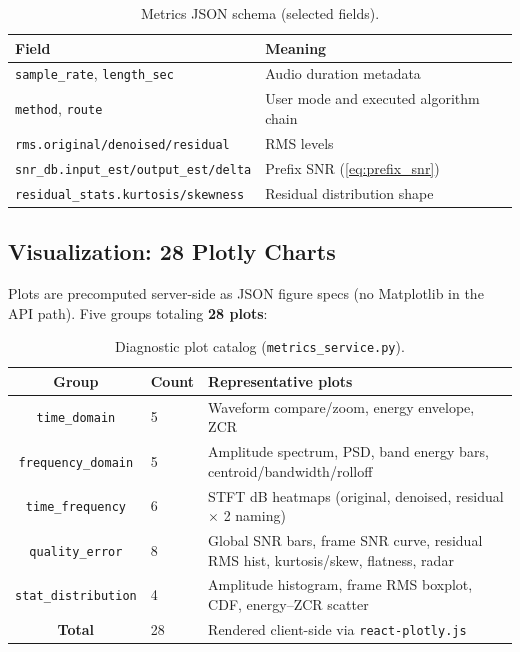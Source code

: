 \begin{table}[H]
  \centering
  \caption{Metrics JSON schema (selected fields).}
  \label{tab:metrics_schema}
  \small
  \begin{tabular}{ll}
    \toprule
    \textbf{Field} & \textbf{Meaning} \\
    \midrule
    \texttt{sample\_rate}, \texttt{length\_sec} & Audio duration metadata \\
    \texttt{method}, \texttt{route} & User mode and executed algorithm chain \\
    \texttt{rms.original/denoised/residual} & RMS levels \\
    \texttt{snr\_db.input\_est/output\_est/delta} & Prefix SNR (\eqref{eq:prefix_snr}) \\
    \texttt{residual\_stats.kurtosis/skewness} & Residual distribution shape \\
    \bottomrule
  \end{tabular}
\end{table}

\subsection{Visualization: 28 Plotly Charts}

Plots are precomputed server-side as JSON figure specs (no Matplotlib in the API path). Five groups totaling \textbf{28 plots}:

\begin{table}[H]
  \centering
  \caption{Diagnostic plot catalog (\texttt{metrics\_service.py}).}
  \label{tab:plot_catalog}
  \footnotesize
  \begin{tabular}{clp{6.2cm}}
    \toprule
    \textbf{Group} & \textbf{Count} & \textbf{Representative plots} \\
    \midrule
    \texttt{time\_domain}       & 5 & Waveform compare/zoom, energy envelope, ZCR \\
    \texttt{frequency\_domain}  & 5 & Amplitude spectrum, PSD, band energy bars, centroid/bandwidth/rolloff \\
    \texttt{time\_frequency}   & 6 & STFT dB heatmaps (original, denoised, residual $\times$ 2 naming) \\
    \texttt{quality\_error}     & 8 & Global SNR bars, frame SNR curve, residual RMS hist, kurtosis/skew, flatness, radar \\
    \texttt{stat\_distribution} & 4 & Amplitude histogram, frame RMS boxplot, CDF, energy--ZCR scatter \\
    \midrule
    \textbf{Total}              & 28 & Rendered client-side via \texttt{react-plotly.js} \\
    \bottomrule
  \end{tabular}
\end{table}

